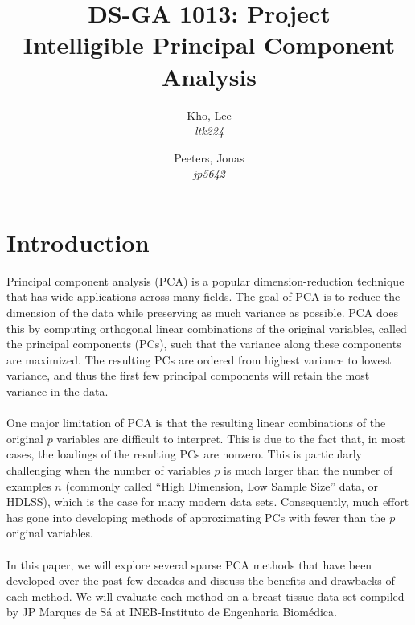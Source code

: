 \documentclass[11pt,letterpaper]{report}
\author{
	Kho, Lee\\
	\textit{ltk224}
	\and
	Peeters, Jonas\\
	\textit{jp5642}
}
\title{DS-GA 1013: Project\\Intelligible Principal Component Analysis}
\begin{document}
\maketitle
\section*{Introduction}

Principal component analysis (PCA) is a popular dimension-reduction technique that has wide applications across many fields. The goal of PCA is to reduce the dimension of the data while preserving as much variance as possible. PCA does this by computing orthogonal linear combinations of the original variables, called the principal components (PCs), such that the variance along these components are maximized.  The resulting PCs are ordered from highest variance to lowest variance, and thus the first few principal components will retain the most variance in the data.\\
\\
One major limitation of PCA is that the resulting linear combinations of the original $p$ variables are difficult to interpret. This is due to the fact that, in most cases, the loadings of the resulting PCs are nonzero. This is particularly challenging when the number of variables $p$ is much larger than the number of examples $n$ (commonly called “High Dimension, Low Sample Size” data, or HDLSS), which is the case for many modern data sets. Consequently, much effort has gone into developing methods of approximating PCs with fewer than the $p$ original variables.\\
\\
In this paper, we will explore several sparse PCA methods that have been developed over the past few decades and discuss the benefits and drawbacks of each method. We will evaluate each method on a breast tissue data set compiled by JP Marques de Sá at INEB-Instituto de Engenharia Biomédica.
\end{document}
